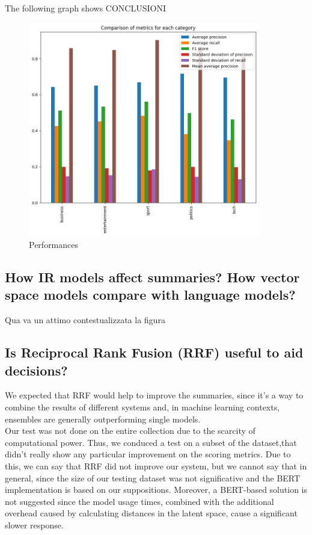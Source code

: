 The following graph shows CONCLUSIONI
\begin{figure}[h]
    \centering
    \includegraphics[width=0.9\textwidth]{images/class_comparison.png}
    \caption{Performances}
    \label{fig:Performances}
\end{figure}


\subsection{How IR models affect summaries? How vector space models compare with language models?}
Qua va un attimo contestualizzata la figura
\subsection{Is Reciprocal Rank Fusion (RRF) useful to aid decisions?}
We expected that RRF would help to improve the summaries, since it's a way to combine the results of different systems and, in machine learning contexts, ensembles are generally outperforming single models. \\
Our test was not done on the entire collection due to the scarcity of computational power. Thus, we conduced a test on a subset of the dataset,that didn't really show any particular improvement on the scoring metrics. Due to this, we can say that RRF did not improve our system, but we cannot say that in general, since the size of our testing dataset was not significative and the BERT implementation is based on our suppositions. 
Moreover, a BERT-based solution is not suggested since the model usage times, combined with the additional overhead caused by calculating distances in the latent space, cause a significant slower response.

